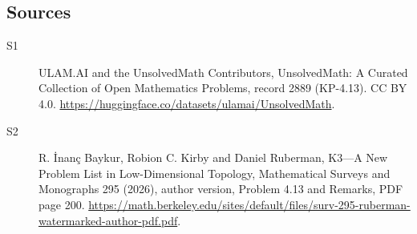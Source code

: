 \documentclass[11pt]{article}
\begin{document}
\subsection{Sources}
\begin{description}
\item[\hypertarget{source:2889:1}{S1}] ULAM.AI and the UnsolvedMath Contributors, UnsolvedMath: A Curated Collection of Open Mathematics Problems, record 2889 (KP-4.13). CC BY 4.0. \url{https://huggingface.co/datasets/ulamai/UnsolvedMath}.
\item[\hypertarget{source:2889:2}{S2}] R. İnanç Baykur, Robion C. Kirby and Daniel Ruberman, K3—A New Problem List in Low-Dimensional Topology, Mathematical Surveys and Monographs 295 (2026), author version, Problem 4.13 and Remarks, PDF page 200. \url{https://math.berkeley.edu/sites/default/files/surv-295-ruberman-watermarked-author-pdf.pdf}.
\end{description}
\label{end:2889}
\end{document}
